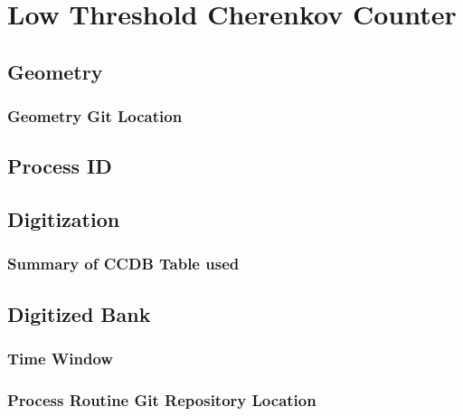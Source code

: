 \section{Low Threshold Cherenkov Counter}


\subsection{Geometry}

\subsubsection{Geometry Git Location}

\subsection{Process ID}

\subsection{Digitization}

\subsubsection{Summary of CCDB Table used}

\subsection{Digitized Bank}

\subsubsection{Time Window}

\subsubsection{Process Routine Git Repository Location}


